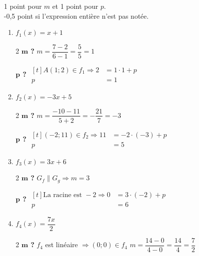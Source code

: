 \documentclass[a4paper, 12pt, parskip=half-]{scrartcl}
\begin{document}
\begin{solution}
    1 point pour $m$ et 1 point pour $p$.\\
    -0,5 point si l'expression entière n'est pas notée.
    \raggedcolumns
    \begin{enumerate}
        \item $f_1(x) = x+1$

              \begin{multicols}{2}
                  \textbf{$\bm{m}$ ?}
                  \medbreak
                  $m=\dfrac{7-2}{6-1}=\dfrac{5}{5}=1$

                  \textbf{$\bm{p}$ ?}
                  \medbreak
                  $\begin{aligned}[t]
                          A(1;2)\in f_1 \Rightarrow 2 & = 1\cdot 1 + p \\
                          p                           & = 1
                      \end{aligned}$
              \end{multicols}
        \item $f_2(x) = -3x+5$
              \begin{multicols}{2}
                  \textbf{$\bm{m}$ ?}
                  \medbreak
                  $m=\dfrac{-10-11}{5+2}=-\dfrac{21}{7}=-3$

                  \textbf{$\bm{p}$ ?}
                  \medbreak
                  $\begin{aligned}[t]
                          (-2;11)\in f_2 \Rightarrow 11 & = -2\cdot (-3) + p \\
                          p                             & = 5
                      \end{aligned}$
              \end{multicols}
        \item $f_3(x) = 3x + 6$
              \begin{multicols}{2}
                  \textbf{$\bm{m}$ ?}
                  \medbreak
                  $G_f \parallel G_g \Rightarrow m = 3$
                  \columnbreak

                  \textbf{$\bm{p}$ ?}
                  \medbreak
                  $\begin{aligned}[t]
                          \text{La racine est }-2\Rightarrow 0 & = 3\cdot (-2) + p \\
                          p                                    & = 6
                      \end{aligned}$
              \end{multicols}
        \item $f_4(x) = \dfrac{7x}{2}$
              \begin{multicols}{2}
                  \textbf{$\bm{m}$ ?}
                  \medbreak
                  $f_4$ est linéaire $\Rightarrow (0;0) \in f_4$
                  \medbreak
                  $m = \dfrac{14-0}{4-0} = \dfrac{14}{4} = \dfrac{7}{2}$
                  \columnbreak


\end{multicols}
\end{enumerate}
\end{solution}
\end{document}
